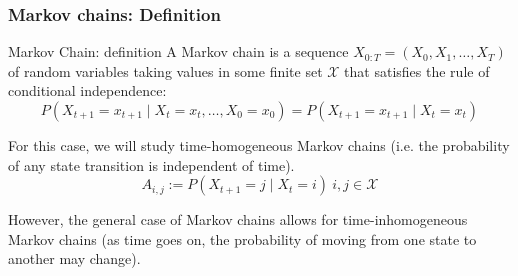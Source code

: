 \documentclass[xcolor=dvipsnames, compress]{beamer}
\begin{document}
\begin{frame}
\frametitle{Markov chains: Definition}

\begin{block}{Markov Chain: definition}
	A Markov chain is a sequence $X_{0:T}=\left(X_{0},X_{1},\ldots,X_{T}\right)$  of random variables taking values in some finite set $\mathcal{X}$ that satisfies the rule of conditional independence:
	\begin{equation*}
	{P}\left(X_{t+1}=x_{t+1}\mid X_{t}=x_{t},\ldots,X_{0}=x_{0}\right)= {P}\left(X_{t+1}=x_{t+1}\mid X_{t}=x_{t}\right)
	\end{equation*}	
\end{block}

For this case, we will study time-homogeneous Markov chains (i.e. the probability of any state transition is independent of time).
\begin{equation*}
A_{i,j}:={P}\left(X_{t+1}=j\mid X_{t}=i\right)\:i,j\in\mathcal{X}
\end{equation*}

However, the general case of Markov chains allows for time-inhomogeneous Markov chains (as time goes on, the probability of moving from one state to another may change). 

\end{frame}
\end{document}
